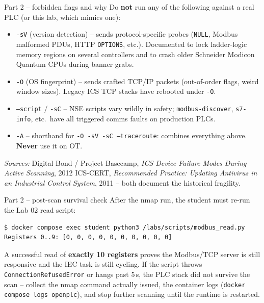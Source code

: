 \documentclass[11pt,a4paper]{article}
\begin{document}
\begin{solutionbox}{Part 2 -- forbidden flags and why}
Do \textbf{not} run any of the following against a real PLC (or this lab, which mimics one):
\begin{itemize}[leftmargin=*, nosep]
  \item \texttt{-sV} (version detection) -- sends protocol-specific probes (\texttt{NULL}, Modbus malformed PDUs, HTTP \texttt{OPTIONS}, etc.). Documented to lock ladder-logic memory regions on several controllers and to crash older Schneider Modicon Quantum CPUs during banner grabs.
  \item \texttt{-O} (OS fingerprint) -- sends crafted TCP/IP packets (out-of-order flags, weird window sizes). Legacy ICS TCP stacks have rebooted under \texttt{-O}.
  \item \texttt{--script} / \texttt{-sC} -- NSE scripts vary wildly in safety; \texttt{modbus-discover}, \texttt{s7-info}, etc.\ have all triggered comms faults on production PLCs.
  \item \texttt{-A} -- shorthand for \texttt{-O -sV -sC --traceroute}: combines everything above. \textbf{Never} use it on OT.
\end{itemize}

{\footnotesize\emph{Sources:} Digital Bond / Project Basecamp, \emph{ICS Device Failure Modes During Active Scanning}, 2012 \textbar{} ICS-CERT, \emph{Recommended Practice: Updating Antivirus in an Industrial Control System}, 2011 -- both document the historical fragility.}
\end{solutionbox}

\begin{solutionbox}{Part 2 -- post-scan survival check}
After the nmap run, the student must re-run the Lab 02 read script:
\begin{lstlisting}[language=bash]
$ docker compose exec student python3 /labs/scripts/modbus_read.py
Registers 0..9: [0, 0, 0, 0, 0, 0, 0, 0, 0, 0]
\end{lstlisting}
A successful read of \textbf{exactly 10 registers} proves the Modbus/TCP server is still responsive and the IEC task is still cycling. If the script throws \texttt{ConnectionRefusedError} or hangs past 5\,s, the PLC stack did not survive the scan -- collect the nmap command actually issued, the container logs (\texttt{docker compose logs openplc}), and stop further scanning until the runtime is restarted.
\end{solutionbox}
\end{document}
